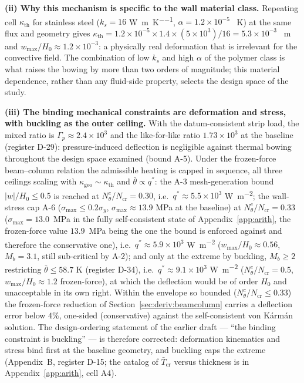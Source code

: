 \textbf{(ii) Why this mechanism is specific to the wall material class.} Repeating cell
$\kappa_{\mathrm{th}}$ for stainless steel ($k_s=16$ \si{\watt\per\metre\per\kelvin},
$\alpha=1.2\times10^{-5}$ \si{\per\kelvin}) at the same flux and geometry gives
$\kappa_{\mathrm{th}}=1.2\times10^{-5}\times1.4\times(5\times10^3)/16=5.3\times10^{-3}$
\si{\per\metre} and $w_{\max}/H_0\approx1.2\times10^{-3}$: a physically real deformation that is
irrelevant for the convective field. The combination of low $k_s$ and high $\alpha$ of the polymer
class is what raises the bowing by more than two orders of magnitude; this material dependence,
rather than any fluid-side property, selects the design space of the study.

\textbf{(iii) The binding mechanical constraints are deformation and stress, with buckling as the
outer ceiling.} With the datum-consistent strip load, the mixed ratio is $\Gamma_p\approx2.4\times10^{3}$ and the
like-for-like ratio $1.73\times10^{3}$ at the baseline (register D-29): pressure-induced deflection is negligible against thermal bowing throughout the design
space examined (bound A-5). Under the frozen-force beam--column relation the admissible heating
is capped in sequence, all three ceilings scaling with
$\kappa_{\mathrm{geo}}\sim\kappa_{\mathrm{th}}$ and $\bar\theta\propto q^{''}$: the A-3
mesh-generation bound $|w|/H_0\le0.5$ is reached at
$N_\theta^c/N_{\mathrm{cr}}=0.30$, i.e.\ $q^{''}\approx5.5\times10^{3}$
\si{\watt\per\square\metre}; the wall-stress cap A-6 ($\sigma_{\max}\le0.2\sigma_y$,
$\sigma_{\max}\approx13.9$ MPa at the baseline) at
$N_\theta^c/N_{\mathrm{cr}}=0.33$ ($\sigma_{\max}=13.0$~MPa in the fully self-consistent state of
Appendix~\ref{app:arith}, the frozen-force value $13.9$~MPa being the one the bound is enforced
against and therefore the conservative one), i.e.\ $q^{''}\approx5.9\times10^{3}$
\si{\watt\per\square\metre} ($w_{\max}/H_0\approx0.56$, $M_b=3.1$, still sub-critical by A-2);
and only at the extreme by buckling, $M_b\ge2$ restricting $\bar\theta\le58.7$ K (register
D-34), i.e.\
$q^{''}\approx9.1\times10^{3}$ \si{\watt\per\square\metre}
($N_\theta^c/N_{\mathrm{cr}}=0.5$, $w_{\max}/H_0\approx1.2$ frozen-force), at which the
deflection would be of order $H_0$ and unacceptable in its own right. Within the envelope so
bounded ($N_\theta^c/N_{\mathrm{cr}}\le0.33$) the frozen-force reduction of
Section~\ref{sec:deriv:beamcolumn} carries a deflection error below $4\%$, one-sided
(conservative) against the self-consistent von K\'arm\'an solution. The design-ordering
statement of the earlier draft --- ``the binding constraint is buckling'' --- is therefore
corrected: deformation kinematics and stress bind first at the baseline geometry, and buckling
caps the extreme (Appendix~B, register D-15; the catalog of $\bar T_{\mathrm{cr}}$ versus
thickness is in Appendix~\ref{app:arith}, cell A4).

